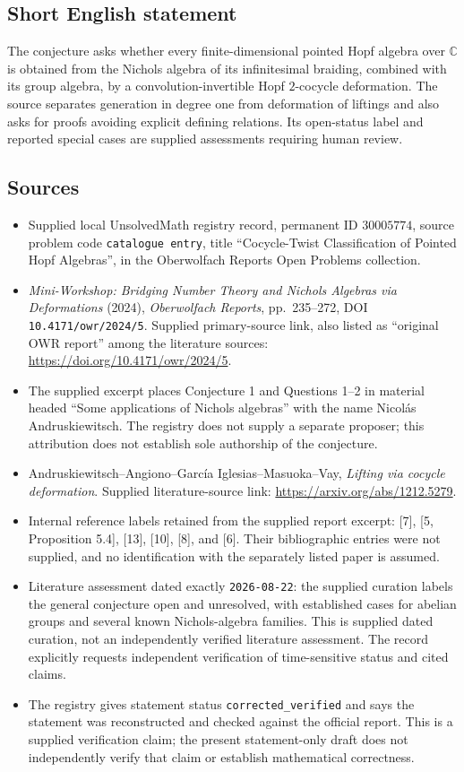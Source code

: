 \documentclass[11pt]{article}
\newcommand{\C}{\mathbb{C}}
\begin{document}
\subsection{Short English statement}
The conjecture asks whether every finite-dimensional pointed Hopf algebra over \(\C\) is obtained from the Nichols algebra of its infinitesimal braiding, combined with its group algebra, by a convolution-invertible Hopf \(2\)-cocycle deformation. The source separates generation in degree one from deformation of liftings and also asks for proofs avoiding explicit defining relations. Its open-status label and reported special cases are supplied assessments requiring human review.
\subsection{Sources}
\begin{itemize}
\item Supplied local UnsolvedMath registry record, permanent ID \(30005774\), source problem code \texttt{catalogue entry}, title ``Cocycle-Twist Classification of Pointed Hopf Algebras'', in the Oberwolfach Reports Open Problems collection.
\item \emph{Mini-Workshop: Bridging Number Theory and Nichols Algebras via Deformations} (2024), \emph{Oberwolfach Reports}, pp.\ 235--272, DOI \texttt{10.4171/owr/2024/5}. Supplied primary-source link, also listed as ``original OWR report'' among the literature sources: \url{https://doi.org/10.4171/owr/2024/5}.
\item The supplied excerpt places Conjecture 1 and Questions 1--2 in material headed ``Some applications of Nichols algebras'' with the name Nicol\'as Andruskiewitsch. The registry does not supply a separate proposer; this attribution does not establish sole authorship of the conjecture.
\item Andruskiewitsch--Angiono--Garc\'ia Iglesias--Masuoka--Vay, \emph{Lifting via cocycle deformation}. Supplied literature-source link: \url{https://arxiv.org/abs/1212.5279}.
\item Internal reference labels retained from the supplied report excerpt: [7], [5, Proposition 5.4], [13], [10], [8], and [6]. Their bibliographic entries were not supplied, and no identification with the separately listed paper is assumed.
\item Literature assessment dated exactly \texttt{2026-08-22}: the supplied curation labels the general conjecture open and unresolved, with established cases for abelian groups and several known Nichols-algebra families. This is supplied dated curation, not an independently verified literature assessment. The record explicitly requests independent verification of time-sensitive status and cited claims.
\item The registry gives statement status \texttt{corrected\_verified} and says the statement was reconstructed and checked against the official report. This is a supplied verification claim; the present statement-only draft does not independently verify that claim or establish mathematical correctness.
\end{itemize}
\end{document}
